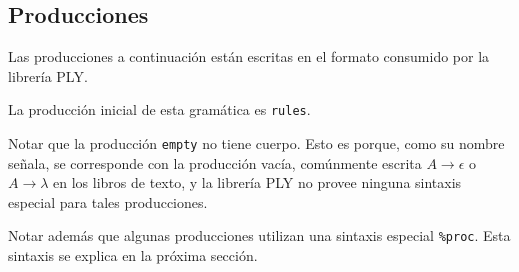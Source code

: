 \documentclass[a4paper, 10pt, twoside]{article}
\begin{document}
\subsection{Producciones}

Las producciones a continuación están escritas en el formato consumido por la librería PLY.

La producción inicial de esta gramática es \texttt{rules}.

Notar que la producción \texttt{empty} no tiene cuerpo. Esto es porque, como su nombre señala, se corresponde con la producción vacía, comúnmente escrita $A \rightarrow \epsilon$ o $A \rightarrow \lambda$ en los libros de texto, y la librería PLY no provee ninguna sintaxis especial para tales producciones.

Notar además que algunas producciones utilizan una sintaxis especial \texttt{\%proc}. Esta sintaxis se explica en la próxima sección.
\end{document}
